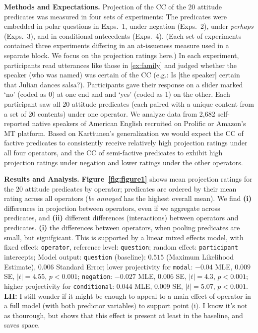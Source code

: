 \documentclass[12pt, a4paper]{article}
\begin{document}
\noindent 
{\bf Methods and Expectations.}
	Projection of the CC of the 20 attitude predicates was measured in four sets of experiments: The predicates were embedded in polar questions in Exps.~1, under negation (Exps.~2), under {\em perhaps} (Exps.~3), and in conditional antecedents (Exps.~4). (Each set of experiments contained three experiments differing in an at-issueness measure used in a separate block. We focus on the projection ratings here.) In each experiment, participants read utterances like those in \ref{ex:family} and judged whether the speaker (who was named) was certain of the CC (e.g.: Is [the speaker] certain that Julian dances salsa?). Participants gave their response on a slider marked `no' (coded as 0) at one end and and `yes' (coded as 1) on the other. Each participant saw all 20 attitude predicates (each paired with a unique content from a set of 20 contents) under one operator. We analyze data from 2,682 self-reported native speakers of American English recruited on Prolific or Amazon's MT platform. Based on Karttunen's generalization we would expect the CC of factive predicates to consistently receive relatively high projection ratings under all four operators, and the CC of semi-factive predicates to exhibit high projection ratings under negation and lower ratings under the other operators.

\noindent
{\bf Results and Analysis.} 
	\textbf{Figure~\ref{fig:figure1}} shows mean projection ratings for the 20 attitude predicates by operator; predicates are ordered by their mean rating across all operators (\emph{be annoyed} has the highest overall mean).
	We find \textbf{(i)} differences in projection between operators, even if we aggregate across predicates, and \textbf{(ii)} different differences (interactions) between operators and predicates. \textbf{(i)} the differences between operators, when pooling predicates are small, but signifgicant. This is supported by a linear mixed effects model, with fixed effect: \texttt{operator}, reference level: \texttt{question}; random effect: \texttt{participant} intercepts; Model output: \texttt{question} (baseline): $0.515$ (Maximum Likelihood Estimate), $0.006$ Standard Error; lower projectivity for \texttt{modal}: $-0.04$ MLE, $0.009$ SE, $|t| = 4.55$, $p < 0.001$; \texttt{negation}: $-0.027$ MLE, $0.006$ SE, $|t| = 4.3$, $p < 0.001$; higher projectivity for \texttt{conditional}: $0.044$ MLE, $0.009$ SE, $|t| = 5.07$, $p < 0.001$.\\

	\noindent
	{\bfseries LH: } I still wonder if it might be enough to appeal to a main effect of operator in a full model (with both predictor variables) to support point (i). I know it's not as thourough, but shows that this effect is present at least in the baseline, and saves space.\\
\end{document}
